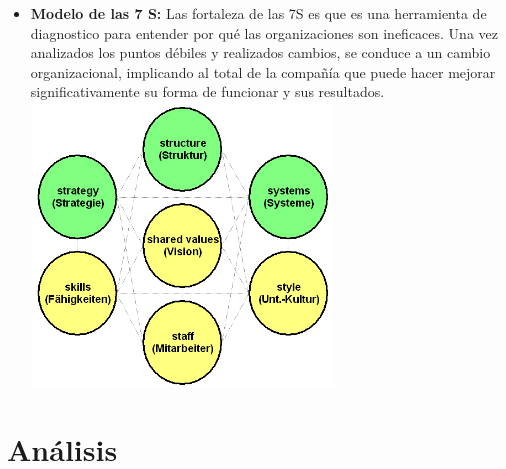 \documentclass[%
 reprint,
 amsmath,amssymb,
 aps,
]{revtex4-1}
\begin{document}
\begin{itemize}
\item \textbf{ Modelo de las 7 S: }
Las fortaleza de las 7S  es que es una herramienta de diagnostico para entender por qué las organizaciones son ineficaces. Una vez analizados los puntos débiles y realizados cambios, se conduce a un cambio organizacional, implicando al total de la compañía que puede hacer mejorar significativamente su forma de funcionar y sus resultados.
\includegraphics[width=8cm]{./Imagenes/img3}

	\end{itemize} 

\section{Análisis}


\end{document}
